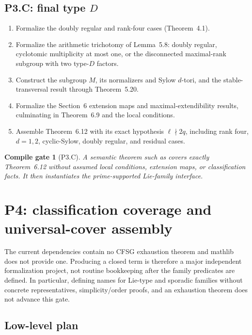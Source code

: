 \documentclass[11pt]{article}
\newtheorem{gate}{Compile gate}
\begin{document}
\subsection{P3.C: final type \(D\)}

\begin{enumerate}[label=\textbf{P3.C\arabic*.},leftmargin=*]
  \item Formalize the doubly regular and rank-four cases (Theorem~4.1).
  \item Formalize the arithmetic trichotomy of Lemma~5.8: doubly regular,
  cyclotomic multiplicity at most one, or the disconnected maximal-rank
  subgroup with two type-\(D\) factors.
  \item Construct the subgroup \(M\), its normalizers and Sylow
  \(d\)-tori, and the stable-transversal result through Theorem~5.20.
  \item Formalize the Section~6 extension maps and maximal-extendibility
  results, culminating in Theorem~6.9 and the local conditions.
  \item Assemble Theorem~6.12 with its exact hypothesis
  \(\ell\nmid 2q\), including rank four, \(d=1,2\), cyclic-Sylow, doubly
  regular, and residual cases.
\end{enumerate}

\begin{gate}[P3.C]
A semantic theorem such as  covers exactly
Theorem~6.12 without assumed local conditions, extension maps, or
classification facts.  It then instantiates the prime-supported Lie-family
interface.
\end{gate}

\section{P4: classification coverage and universal-cover assembly}

The current dependencies contain no CFSG exhaustion theorem and mathlib
does not provide one.  Producing a closed  term is
therefore a major independent formalization project, not routine
bookkeeping after the family predicates are defined.  In particular,
defining names for Lie-type and sporadic families without concrete
representatives, simplicity/order proofs, and an exhaustion theorem does
not advance this gate.

\subsection*{Low-level plan}
\end{document}
